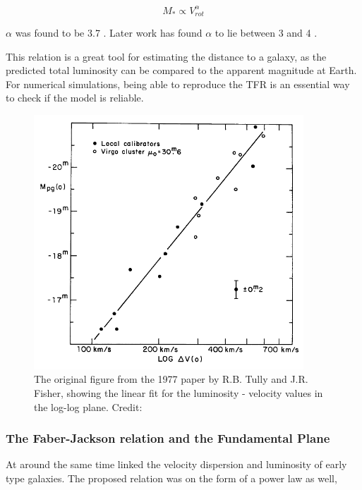 \begin{equation}
    M_* \propto V_{rot}^\alpha 
\end{equation}

$\alpha$ was found to be 3.7 \parencite{TullyFisher1977}. Later work has found $\alpha$ to lie between 3 and 4 \parencite{Lelli2019, Bloom2017}.

This relation is a great tool for estimating the distance to a galaxy, as the predicted total luminosity can be compared to the apparent magnitude at Earth. For numerical simulations, being able to reproduce the TFR is an essential way to check if the model is reliable.

\begin{figure}
    \centering
    \includegraphics[width=0.9\textwidth]{images/tully_fisher.png}
    \caption{The original figure from the 1977 paper by R.B. Tully and J.R. Fisher, showing the linear fit for the luminosity - velocity values in the log-log plane. Credit: \textcite{TullyFisher1977}}
    \label{tully_fisher}
\end{figure}

\subsubsection{The Faber-Jackson relation and the Fundamental Plane}
At around the same time \textcite{TullyFisher1977} linked the velocity dispersion and luminosity of early type galaxies. The proposed relation was on the form of a power law as well,

